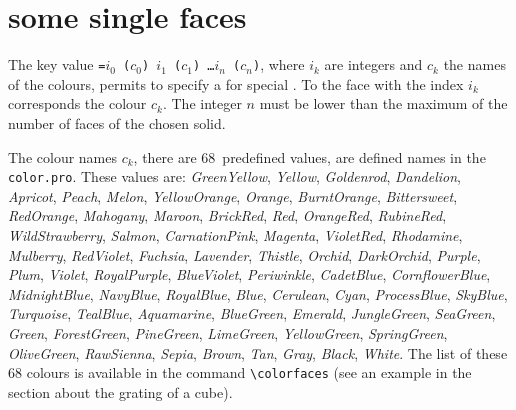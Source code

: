 \section{ some single faces}

The key value \texttt{=$i_0$~($c_0$) $i_1$~($c_1$) \dots $i_n$~($c_n$)},
where $i_k$ are integers and $c_k$ the names of the colours, permits to
specify a  for special .
To the face with the index $i_k$ corresponds the colour $c_k$. The
integer $n$ must be lower than the maximum of the number of faces of the chosen solid.



The colour names $c_k$, there are $68$~predefined values, are defined names in the
\texttt{color.pro}. These values are:
\textsl{GreenYellow},
\textsl{Yellow},
\textsl{Goldenrod},
\textsl{Dandelion},
\textsl{Apricot},
\textsl{Peach},
\textsl{Melon},
\textsl{YellowOrange},
\textsl{Orange},
\textsl{BurntOrange},
\textsl{Bittersweet},
\textsl{RedOrange},
\textsl{Mahogany},
\textsl{Maroon},
\textsl{BrickRed},
\textsl{Red},
\textsl{OrangeRed},
\textsl{RubineRed},
\textsl{WildStrawberry},
\textsl{Salmon},
\textsl{CarnationPink},
\textsl{Magenta},
\textsl{VioletRed},
\textsl{Rhodamine},
\textsl{Mulberry},
\textsl{RedViolet},
\textsl{Fuchsia},
\textsl{Lavender},
\textsl{Thistle},
\textsl{Orchid},
\textsl{DarkOrchid},
\textsl{Purple},
\textsl{Plum},
\textsl{Violet},
\textsl{RoyalPurple},
\textsl{BlueViolet},
\textsl{Periwinkle},
\textsl{CadetBlue},
\textsl{CornflowerBlue},
\textsl{MidnightBlue},
\textsl{NavyBlue},
\textsl{RoyalBlue},
\textsl{Blue},
\textsl{Cerulean},
\textsl{Cyan},
\textsl{ProcessBlue},
\textsl{SkyBlue},
\textsl{Turquoise},
\textsl{TealBlue},
\textsl{Aquamarine},
\textsl{BlueGreen},
\textsl{Emerald},
\textsl{JungleGreen},
\textsl{SeaGreen},
\textsl{Green},
\textsl{ForestGreen},
\textsl{PineGreen},
\textsl{LimeGreen},
\textsl{YellowGreen},
\textsl{SpringGreen},
\textsl{OliveGreen},
\textsl{RawSienna},
\textsl{Sepia},
\textsl{Brown},
\textsl{Tan},
\textsl{Gray},
\textsl{Black},
\textsl{White}.
The list of these $68$ colours is available in the command
\verb+\colorfaces+ (see an example in the section about
the grating  of a cube).

